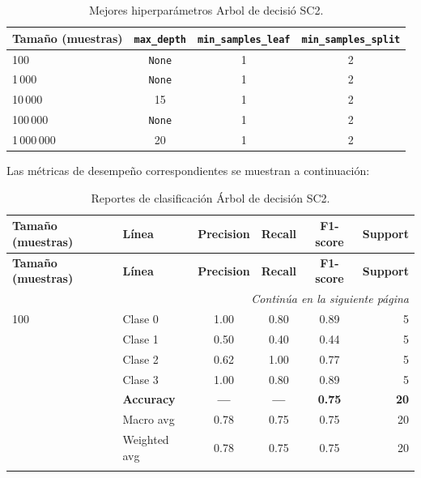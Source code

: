 \documentclass[12pt,a4paper]{article}
\begin{document}
\begin{enumerate}
  \begin{table}[htbp]
    \centering\small
    \setlength{\tabcolsep}{4pt}
    \begin{tabularx}{\linewidth}{@{}lccc@{}}
      \toprule
      \textbf{Tamaño (muestras)} & \texttt{max\_depth} & \texttt{min\_samples\_leaf} & \texttt{min\_samples\_split} \\
      \midrule
      100         & \texttt{None} & 1 & 2 \\
      1\,000      & \texttt{None} & 1 & 2 \\
      10\,000     & 15            & 1 & 2 \\
      100\,000    & \texttt{None} & 1 & 2 \\
      1\,000\,000 & 20            & 1 & 2 \\
      \bottomrule
    \end{tabularx}
    \caption{Mejores hiperparámetros Arbol de decisió SC2.}
    \label{tab:best_hparams_dt_sc2}
  \end{table}

  Las métricas de desempeño correspondientes se muestran a continuación:

  \small
  \setlength{\tabcolsep}{4pt}
  \begin{longtable}{@{}l l c c c r@{}}
    \toprule
    \textbf{Tamaño (muestras)} & \textbf{Línea} & \textbf{Precision} & \textbf{Recall} & \textbf{F1-score} & \textbf{Support} \\
    \midrule
    \endfirsthead

    \toprule
    \textbf{Tamaño (muestras)} & \textbf{Línea} & \textbf{Precision} & \textbf{Recall} & \textbf{F1-score} & \textbf{Support} \\
    \midrule
    \endhead

    \midrule
    \multicolumn{6}{r}{\emph{Continúa en la siguiente página}} \\
    \endfoot

    \bottomrule
    \caption{Reportes de clasificación Árbol de decisión SC2.}
    \label{tab:dt_metrics_by_size}
    \endlastfoot

    100   & Clase 0       & 1.00 & 0.80 & 0.89 & 5 \\
          & Clase 1       & 0.50 & 0.40 & 0.44 & 5 \\
          & Clase 2       & 0.62 & 1.00 & 0.77 & 5 \\
          & Clase 3       & 1.00 & 0.80 & 0.89 & 5 \\
          & \textbf{Accuracy}    & \textbf{—}   & \textbf{—}   & \textbf{0.75} & \textbf{20} \\
          & Macro avg     & 0.78 & 0.75 & 0.75 & 20 \\
          & Weighted avg  & 0.78 & 0.75 & 0.75 & 20 \\
    \addlinespace


\end{longtable}
\end{enumerate}
\end{document}
